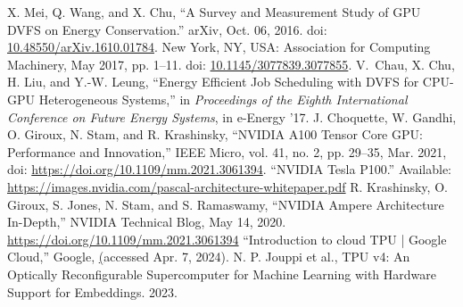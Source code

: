 \begin{thebibliography}{00}
     X. Mei, Q. Wang, and X. Chu, ``A Survey and Measurement Study of GPU DVFS on Energy Conservation.'' arXiv, Oct. 06, 2016. doi: \href{https://doi.org/10.48550/arXiv.1610.01784}{10.48550/arXiv.1610.01784}. New York, NY, USA: Association for Computing Machinery, May 2017, pp. 1–11. doi: \href{https://doi.org/10.1145/3077839.3077855}{10.1145/3077839.3077855}.
     V. Chau, X. Chu, H. Liu, and Y.-W. Leung, ``Energy Efficient Job Scheduling with DVFS for CPU-GPU Heterogeneous Systems,'' in \textit{Proceedings of the Eighth International Conference on Future Energy Systems}, in e-Energy ’17.
 J. Choquette, W. Gandhi, O. Giroux, N. Stam, and R. Krashinsky, ``NVIDIA A100 Tensor Core GPU: Performance and Innovation,'' IEEE Micro, vol. 41, no. 2, pp. 29–35, Mar. 2021, doi: \href{https://doi.org/10.1109/mm.2021.3061394}{https://doi.org/10.1109/mm.2021.3061394}.
 ``NVIDIA Tesla P100.'' Available: \href{https://images.nvidia.com/content/pdf/tesla/whitepaper/pascal-architecture-whitepaper.pdf}{https://images.nvidia.com/pascal-architecture-whitepaper.pdf}
 R. Krashinsky, O. Giroux, S. Jones, N. Stam, and S. Ramaswamy, ``NVIDIA Ampere Architecture In-Depth,'' NVIDIA Technical Blog, May 14, 2020. \href{https://developer.nvidia.com/blog/nvidia-ampere-architecture-in-depth/}{https://doi.org/10.1109/mm.2021.3061394}
 ``Introduction to cloud TPU  |  Google Cloud,'' Google, \href{https://cloud.google.com/tpu/docs/intro-to-tpu} (accessed Apr. 7, 2024).
     N. P. Jouppi et al., TPU v4: An Optically Reconfigurable Supercomputer for Machine Learning with Hardware Support for Embeddings. 2023.
\end{thebibliography}
